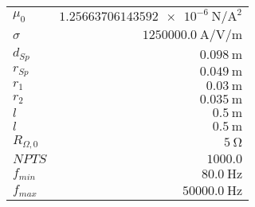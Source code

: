 
{%
    \begin{center}
    \label{tab:fitparams:st:R}
    \begin{tabular}{lr}
    \toprule
        $\mu_0$ & $\SI{1.25663706143592e-6}{\newton\per\ampere\squared}$\\
        $\sigma$ & $\SI{1250000.0}{\ampere\per\volt\per\meter}$\\
        $d_{Sp}$ & $\SI{0.098}{\meter}$\\
        $r_{Sp}$ & $\SI{0.049}{\meter}$\\
        $r_1$ & $\SI{0.03}{\meter}$\\
        $r_2$ & $\SI{0.035}{\meter}$\\
        $l$ & $\SI{0.5}{\meter}$\\
        $l$ & $\SI{0.5}{\meter}$\\
        $R_{\Omega,0}$ & $\SI{5}{\ohm}$\\
        $NPTS$ & $\num{1000.0}$\\
        $f_{min}$ & $\SI{80.0}{\hertz}$\\
        $f_{max}$ & $\SI{50000.0}{\hertz}$\\

    \bottomrule
    \end{tabular}
    \end{center}
}

